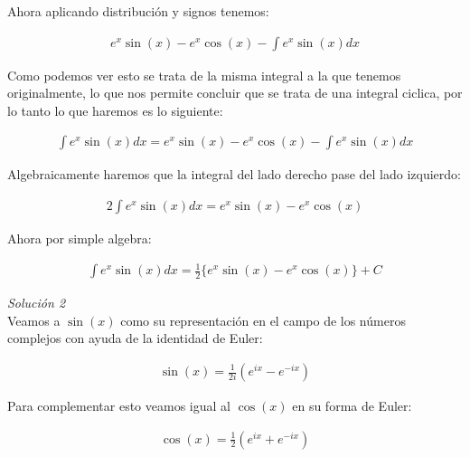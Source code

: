 Ahora aplicando distribución y signos tenemos:

\begin{equation*}
    \begin{gathered}
        e^{x}\sin(x)-e^{x}\cos(x)-\int e^{x}\sin(x)dx
    \end{gathered}
\end{equation*}

Como podemos ver esto se trata de la misma integral a la que tenemos originalmente, lo que nos permite concluir que se trata de una integral ciclica, por lo tanto lo que haremos es lo siguiente:

\begin{equation*}
    \begin{gathered}
        \int e^{x}\sin(x)dx = e^{x}\sin(x)-e^{x}\cos(x)-\int e^{x}\sin(x)dx
    \end{gathered}
\end{equation*}

Algebraicamente haremos que la integral del lado derecho pase del lado izquierdo:

\begin{equation*}
    \begin{gathered}
        2\int e^{x}\sin(x)dx = e^{x}\sin(x)-e^{x}\cos(x)
    \end{gathered}
\end{equation*}

Ahora por simple algebra:

\begin{equation*}
    \begin{gathered}
        \int e^{x}\sin(x)dx = \frac{1}{2}\{e^{x}\sin(x)-e^{x}\cos(x)\}+C
    \end{gathered}
\end{equation*}

\textit{Solución 2}\\
Veamos a \(\displaystyle\sin(x)\) como su representación en el campo de los números complejos con ayuda de la identidad de Euler:

\begin{equation*}
    \begin{gathered}
        \sin(x)= \frac{1}{2i}(e^{ix}-e^{-ix})
    \end{gathered}
\end{equation*}

Para complementar esto veamos igual al \(\displaystyle\cos(x)\) en su forma de Euler:

\begin{equation*}
    \begin{gathered}
        \cos(x)= \frac{1}{2}(e^{ix}+e^{-ix})
    \end{gathered}
\end{equation*}

